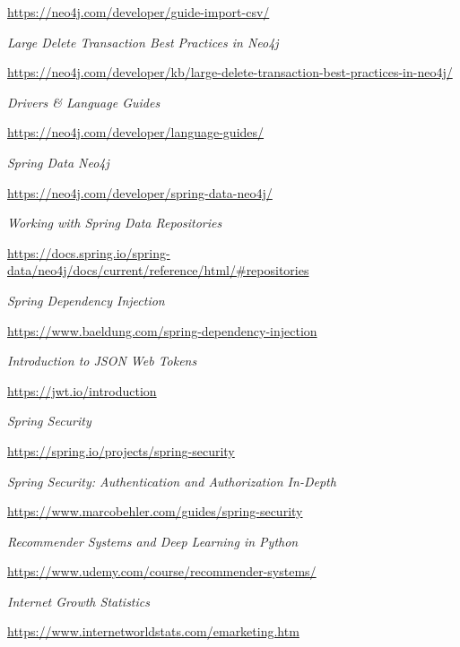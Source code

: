\documentclass[12pt,a4paper]{report}
\begin{document}
\begin{thebibliography}{9}
  \url{https://neo4j.com/developer/guide-import-csv/}
  
  
  \textit{Large Delete Transaction Best Practices in Neo4j}
  
  \url{https://neo4j.com/developer/kb/large-delete-transaction-best-practices-in-neo4j/}
  
  
  \textit{Drivers \& Language Guides}
  
  \url{https://neo4j.com/developer/language-guides/}
  
  
  \textit{Spring Data Neo4j}
  
  \url{https://neo4j.com/developer/spring-data-neo4j/}
  
  
  \textit{Working with Spring Data Repositories}
  
  \url{https://docs.spring.io/spring-data/neo4j/docs/current/reference/html/#repositories}
  
  
  \textit{Spring Dependency Injection}
  
  \url{https://www.baeldung.com/spring-dependency-injection}
  
  
  \textit{Introduction to JSON Web Tokens}
  
  \url{https://jwt.io/introduction}
  
  
  \textit{Spring Security}
  
  \url{https://spring.io/projects/spring-security}
  
  
  \textit{Spring Security: Authentication and Authorization In-Depth}
  
  \url{https://www.marcobehler.com/guides/spring-security}
  
  
  \textit{Recommender Systems and Deep Learning in Python}
  
  \url{https://www.udemy.com/course/recommender-systems/}
  
  
  \textit{Internet Growth Statistics}
  
  \url{https://www.internetworldstats.com/emarketing.htm}
  

\end{thebibliography}
\end{document}

